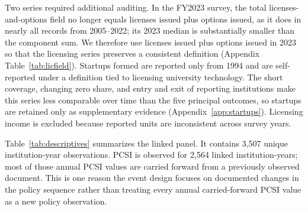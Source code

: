 Two series required additional auditing. In the FY2023 survey, the total licenses-and-options field no longer equals licenses issued plus options issued, as it does in nearly all records from 2005--2022; its 2023 median is substantially smaller than the component sum. We therefore use licenses issued plus options issued in 2023 so that the licensing series preserves a consistent definition (Appendix Table~\ref{tab:licfield}). Startups formed are reported only from 1994 and are self-reported under a definition tied to licensing university technology. The short coverage, changing zero share, and entry and exit of reporting institutions make this series less comparable over time than the five principal outcomes, so startups are retained only as supplementary evidence (Appendix~\ref{app:startups}). Licensing income is excluded because reported units are inconsistent across survey years.

Table~\ref{tab:descriptives} summarizes the linked panel. It contains 3,507 unique institution-year observations. PCSI is observed for 2,564 linked institution-years; most of those annual PCSI values are carried forward from a previously observed document. This is one reason the event design focuses on documented changes in the policy sequence rather than treating every annual carried-forward PCSI value as a new policy observation.


